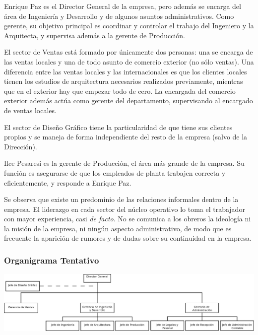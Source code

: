 \documentclass[a4paper,10pt,titlepage]{article}
\begin{document}
Enrique Paz es el Director General de la empresa, pero adem\'as se encarga del \'area de Ingenier\'ia y Desarrollo y de algunos asuntos administrativos. Como gerente, su objetivo principal es coordinar y controlar el trabajo del Ingeniero y la Arquitecta, y supervisa adem\'as a la gerente de Producci\'on. 

El sector de Ventas est\'a formado por \'unicamente dos personas: una se encarga de las ventas locales y una de todo asunto de comercio exterior (no s\'olo ventas). Una diferencia entre las ventas locales y las internacionales es que los clientes locales tienen los estudios de arquitectura necesarios realizados previamente, mientras que en el exterior hay que empezar todo de cero. La encargada del comercio exterior además actúa como gerente del departamento, supervisando al encargado de ventas locales.

El sector de Dise\~no Gr\'afico tiene la particularidad de que tiene sus clientes propios y se maneja de forma independiente del resto de la empresa (salvo de la Direcci\'on).

Ilce Pesaresi es la gerente de Producci\'on, el \'area m\'as grande de la empresa. Su funci\'on es asegurarse de que los empleados de planta trabajen correcta y eficientemente, y responde a Enrique Paz. 

Se observa que existe un predominio de las relaciones informales dentro de la empresa. El liderazgo en cada sector del n\'ucleo operativo lo toma el trabajador con mayor experiencia, casi \textit{de facto}. No se comunica a los obreros la ideolog\'ia ni la misi\'on de la empresa, ni ning\'un aspecto administrativo, de modo que es frecuente la aparici\'on de rumores y de dudas sobre su continuidad en la empresa.

\subsubsection*{\textbf{Organigrama Tentativo}}
\begin {center}
	\includegraphics[angle=90,scale=0.45]{./Organigramas/IcomOrganigramaNuestro2.png}
\end{center}
\newpage
\end{document}
